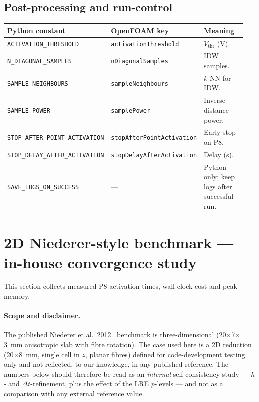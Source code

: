\documentclass[11pt,a4paper]{article}
\newcommand{\code}[1]{\texttt{\small #1}}
\begin{document}
\subsection{Post-processing and run-control}
\begin{longtable}{@{}p{0.35\linewidth}p{0.30\linewidth}p{0.30\linewidth}@{}}
\toprule
Python constant & OpenFOAM key & Meaning \\
\midrule \endhead
\code{ACTIVATION\_THRESHOLD} & \code{activationThreshold} &
   $V_{\text{thr}}$ (V). \\
\code{N\_DIAGONAL\_SAMPLES} & \code{nDiagonalSamples} & IDW samples. \\
\code{SAMPLE\_NEIGHBOURS} & \code{sampleNeighbours} & $k$-NN for IDW. \\
\code{SAMPLE\_POWER} & \code{samplePower} & Inverse-distance power. \\
\code{STOP\_AFTER\_POINT\_ACTIVATION} &
   \code{stopAfterPointActivation} & Early-stop on P8. \\
\code{STOP\_DELAY\_AFTER\_ACTIVATION} &
   \code{stopDelayAfterActivation} & Delay (s). \\
\code{SAVE\_LOGS\_ON\_SUCCESS} & --- &
   Python-only; keep logs after successful run. \\
\bottomrule
\end{longtable}

\section{2D Niederer-style benchmark --- in-house convergence study}
\label{sec:results}

This section collects measured P8 activation times, wall-clock cost
and peak memory.

\paragraph{Scope and disclaimer.}
The published Niederer et al.~2012~\cite{niederer2012} benchmark is
three-dimensional (20$\times$7$\times$3~mm anisotropic slab with
fibre rotation). The case used here is a 2D reduction
(20$\times$8~mm, single cell in $z$, planar fibres) defined for
code-development testing only and not reflected, to our knowledge, in
any published reference. The numbers below should therefore be read
as an \emph{internal} self-consistency study --- $h$- and
$\Delta t$-refinement, plus the effect of the LRE $p$-levels --- and
not as a comparison with any external reference value.
\end{document}
